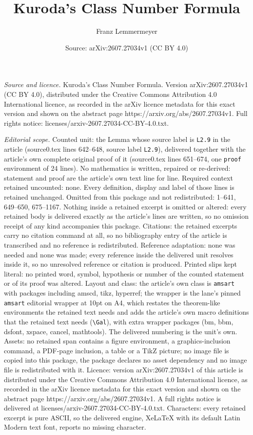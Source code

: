 \documentclass[10pt,a4paper]{amsart}
\title[Kuroda's Class Number Formula]{Kuroda's Class Number Formula}
\author{Franz Lemmermeyer}
\date{Source: arXiv:2607.27034v1 (CC BY 4.0)}
\begin{document}
\maketitle

\noindent\emph{Source and licence.} Kuroda's Class Number Formula. Version arXiv:2607.27034v1 (CC BY 4.0), distributed under the Creative Commons Attribution 4.0 International licence, as recorded in the arXiv licence metadata for this exact version and shown on the abstract page https://arxiv.org/abs/2607.27034v1. Full rights notice: licenses/arxiv-2607.27034-CC-BY-4.0.txt.\par\smallskip

\noindent\textit{Editorial scope.} Counted unit: the Lemma whose source label is \texttt{L2.9} in the article (source0.tex lines 642--648, source label \texttt{L2.9}), delivered together with the article's own complete original proof of it (source0.tex lines 651--674, one \texttt{proof} environment of 24 lines). No mathematics is written, repaired or re-derived: statement and proof are the article's own text line for line. Required context retained uncounted: none. Every definition, display and label of those lines is retained unchanged. Omitted from this package and not redistributed: 1--641, 649--650, 675--1167. Nothing inside a retained excerpt is omitted or altered: every retained body is delivered exactly as the article's lines are written, so no omission receipt of any kind accompanies this package. Citations: the retained excerpts carry no citation command at all, so no bibliography entry of the article is transcribed and no reference is redistributed. Reference adaptation: none was needed and none was made; every reference inside the delivered unit resolves inside it, so no unresolved reference or citation is produced. Printed slips kept literal: no printed word, symbol, hypothesis or number of the counted statement or of its proof was altered. Layout and class: the article's own class is \texttt{amsart} with packages including amscd, tikz, hyperref; the wrapper is the lane's pinned \texttt{amsart} editorial wrapper at 10pt on A4, which restates the theorem-like environments the retained text needs and adds the article's own macro definitions that the retained text needs (\texttt{\textbackslash Gal}), with extra wrapper packages (bm, bbm, dsfont, xspace, cancel, mathtools). The delivered numbering is the unit's own. Assets: no retained span contains a figure environment, a graphics-inclusion command, a PDF-page inclusion, a table or a TikZ picture; no image file is copied into this package, the package declares no asset dependency and no image file is redistributed with it. Licence: version arXiv:2607.27034v1 of this article is distributed under the Creative Commons Attribution 4.0 International licence, as recorded in the arXiv licence metadata for this exact version and shown on the abstract page https://arxiv.org/abs/2607.27034v1. A full rights notice is delivered at licenses/arxiv-2607.27034-CC-BY-4.0.txt. Characters: every retained excerpt is pure ASCII, so the delivered engine, XeLaTeX with its default Latin Modern text font, reports no missing character.
\end{document}
